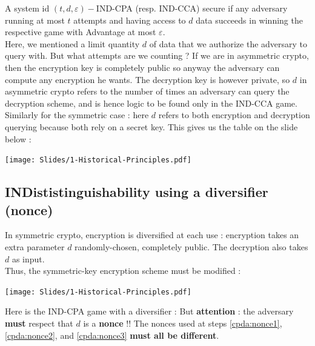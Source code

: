 \documentclass[a4paper, 12pt]{book}
\begin{document}
A system id $(t,d,\varepsilon)-$IND-CPA (resp. IND-CCA) secure if any adversary running at most $t$ attempts and having access to $d$ data succeeds in winning the respective game with Advantage at most $\varepsilon$. \\

Here, we mentioned a limit quantity $d$ of data that we authorize the adversary to query with. But what attempts are we counting ? If we are in asymmetric crypto, then the encryption key is completely public so anyway the adversary can compute any encryption he wants. The decryption key is however private, so $d$ in asymmetric crypto refers to the number of times an adversary can query the decryption scheme, and is hence logic to be found only in the IND-CCA game. Similarly for the symmetric case : here $d$ refers to both encryption and decryption querying because both rely on a secret key. This gives us the table on the slide below : 

\begin{center}
    \texttt{[image: Slides/1-Historical-Principles.pdf]}
\end{center}

\subsection{INDististinguishability using a diversifier (nonce)}
In symmetric crypto, encryption is diversified at each use : encryption takes an extra parameter $d$ randomly-chosen, completely public. The decryption also takes $d$ as input. \\

Thus, the symmetric-key encryption scheme must be modified :
\begin{center}
    \texttt{[image: Slides/1-Historical-Principles.pdf]}
\end{center}

Here is the IND-CPA game with a diversifier :
But \textbf{attention} : the adversary \textbf{must} respect that $d$ is a \textbf{nonce} !! The nonces used at steps \ref{cpda:nonce1}, \ref{cpda:nonce2}, and \ref{cpda:nonce3} \textbf{must all be different}.
\end{document}
